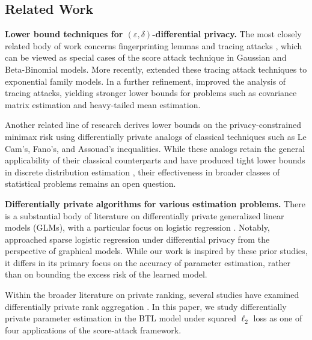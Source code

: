 \documentclass[letterpaper,12pt]{article}
\numberwithin{equation}{section}
\theoremstyle{plain}
\numberwithin{Theorem}{section}
\numberwithin{proposition}{section}
\numberwithin{Lemma}{section}
{
	\theoremstyle{definition}
	\newtheorem{Definition}{Definition}
	\newtheorem{example}{Example}
	\numberwithin{example}{section}
	\newtheorem{fact}{Fact}
	\numberwithin{fact}{section}
	\newtheorem{remark}{Remark}
}
\newcommand{\1}{\mathbbm{1}}
\begin{document}
\subsection{Related Work}

\textbf{Lower bound techniques for $(\varepsilon, \delta)$-differential privacy.} The most closely related body of work concerns fingerprinting lemmas and tracing attacks \citep{tardos2008optimal, bun2014fingerprinting, steinke2017tight, kamath2018privately}, which can be viewed as special cases of the score attack technique in Gaussian and Beta-Binomial models. More recently, \cite{kamath2022new} extended these tracing attack techniques to exponential family models. In a further refinement, \cite{narayanan2023better} improved the analysis of tracing attacks, yielding stronger lower bounds for problems such as covariance matrix estimation and heavy-tailed mean estimation.

Another related line of research \cite{barber2014privacy, karwa2017finite, acharya2018differentially, acharya2021differentially} derives lower bounds on the privacy-constrained minimax risk using differentially private analogs of classical techniques such as Le Cam's, Fano's, and Assouad's inequalities. While these analogs retain the general applicability of their classical counterparts and have produced tight lower bounds in discrete distribution estimation \cite{acharya2018differentially, acharya2021differentially}, their effectiveness in broader classes of statistical problems remains an open question.

\textbf{Differentially private algorithms for various estimation problems.} There is a substantial body of literature on differentially private generalized linear models (GLMs), with a particular focus on logistic regression \cite{chaudhuri2009privacy, chaudhuri2011differentially, zhang2020privately, song2022distributed, song2021evading, avella2021privacy, avella2021differentially}. Notably, \cite{zhang2020privately} approached sparse logistic regression under differential privacy from the perspective of graphical models. While our work is inspired by these prior studies, it differs in its primary focus on the accuracy of parameter estimation, rather than on bounding the excess risk of the learned model.

Within the broader literature on private ranking, several studies have examined differentially private rank aggregation \cite{shang2014application, hay2017differentially, song2022distributed, li2022differentially, xu2023ranking}. In this paper, we study differentially private parameter estimation in the BTL model under squared $\ell_2$ loss as one of four applications of the score-attack framework.
\end{document}
